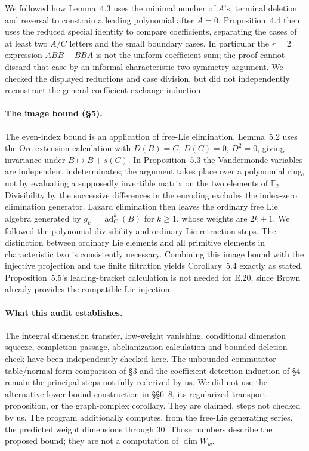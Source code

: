 We followed how Lemma~4.3 uses the minimal number of $A$'s, terminal
deletion and reversal to constrain a leading polynomial after $A=0$.
Proposition~4.4 then uses the reduced special identity to compare
coefficients, separating the cases of at least two $A/C$ letters and
the small boundary cases.  In particular the $r=2$ expression
$ABB+BBA$ is not the uniform coefficient sum; the proof cannot discard
that case by an informal characteristic-two symmetry argument.
We checked the displayed reductions and case division, but did not
independently reconstruct the general coefficient-exchange induction.

\paragraph{The image bound (\S5).}
The even-index bound is an application of free-Lie elimination.
Lemma~5.2 uses the Ore-extension calculation with
$D(B)=C$, $D(C)=0$, $D^2=0$, giving invariance under
$B\mapsto B+s(C)$.  In Proposition~5.3 the Vandermonde variables
are independent indeterminates; the argument takes place over a
polynomial ring, not by evaluating a supposedly invertible matrix on
the two elements of $\mathbb F_2$.  Divisibility by the successive
differences in the encoding excludes the index-zero elimination
generator.  Lazard elimination then leaves the ordinary free Lie
algebra generated by
$g_k=\operatorname{ad}_C^k(B)$ for $k\geq1$, whose weights are
$2k+1$.  We followed the polynomial divisibility and ordinary-Lie
retraction steps.  The distinction between ordinary Lie elements and
all primitive elements in characteristic two is consistently necessary.
Combining this image bound with the injective projection and the finite
filtration yields Corollary~5.4 exactly as stated.  Proposition~5.5's
leading-bracket calculation is not needed for E.20, since Brown already
provides the compatible Lie injection.

\paragraph{What this audit establishes.}
The integral dimension transfer, low-weight vanishing, conditional
dimension squeeze, completion passage, abelianization calculation and
bounded deletion check have been independently checked here.  The
unbounded commutator-table/normal-form comparison of \S3 and the
coefficient-detection induction of \S4 remain the principal steps not
fully rederived by us.  We did not use the alternative lower-bound
construction in \S\S6--8, its regularized-transport proposition, or
the graph-complex corollary.  They are claimed, steps not checked by us.
The program additionally computes, from the free-Lie generating series,
the predicted weight dimensions through 30.  Those numbers describe
the proposed bound; they are not a computation of $\dim W_w$.

